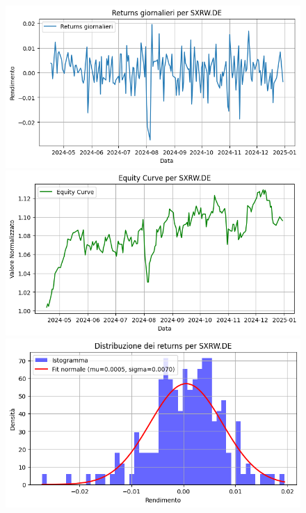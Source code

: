 \documentclass{article}%
\begin{document}
\begin{figure}[htbp]%
\begin{minipage}{0.31\textwidth}%
\includegraphics[width=\linewidth]{immagini_tickers/SXRW.DE_returns_plot.png}%
\end{minipage}%
\begin{minipage}{0.31\textwidth}%
\includegraphics[width=\linewidth]{immagini_tickers/SXRW.DE_equity_curve.png}%
\end{minipage}%
\begin{minipage}{0.31\textwidth}%
\includegraphics[width=\linewidth]{immagini_tickers/SXRW.DE_distribuzione_returns.png}%
\end{minipage}%
\end{figure}
\end{document}
